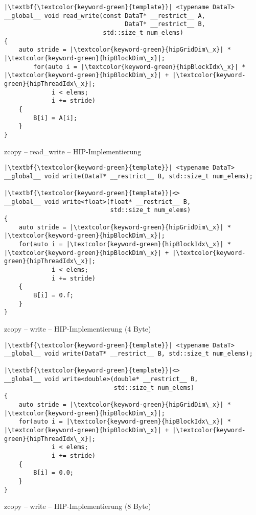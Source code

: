 \begin{code}
    \begin{verbatim}
|\textbf{\textcolor{keyword-green}{template}}| <typename DataT>
__global__ void read_write(const DataT* __restrict__ A,
                                 DataT* __restrict__ B,
                           std::size_t num_elems)
{
    auto stride = |\textcolor{keyword-green}{hipGridDim\_x}| * |\textcolor{keyword-green}{hipBlockDim\_x}|;
        for(auto i = |\textcolor{keyword-green}{hipBlockIdx\_x}| * |\textcolor{keyword-green}{hipBlockDim\_x}| + |\textcolor{keyword-green}{hipThreadIdx\_x}|;
             i < elems;
             i += stride)
    {
        B[i] = A[i];
    }
}
    \end{verbatim}
    \caption{zcopy -- read\_write -- HIP-Implementierung}
    \label{anhang:hip:zcopyrw}
\end{code}

\begin{code}
    \begin{verbatim}
|\textbf{\textcolor{keyword-green}{template}}| <typename DataT>
__global__ void write(DataT* __restrict__ B, std::size_t num_elems);

|\textbf{\textcolor{keyword-green}{template}}|<>
__global__ void write<float>(float* __restrict__ B,
                             std::size_t num_elems)
{
    auto stride = |\textcolor{keyword-green}{hipGridDim\_x}| * |\textcolor{keyword-green}{hipBlockDim\_x}|;
    for(auto i = |\textcolor{keyword-green}{hipBlockIdx\_x}| * |\textcolor{keyword-green}{hipBlockDim\_x}| + |\textcolor{keyword-green}{hipThreadIdx\_x}|;
             i < elems;
             i += stride)
    {
        B[i] = 0.f;
    }
}
    \end{verbatim}
    \caption{zcopy -- write -- HIP-Implementierung (4 Byte)}
    \label{anhang:hip:zcopyw4}
\end{code}

\begin{code}
    \begin{verbatim}
|\textbf{\textcolor{keyword-green}{template}}| <typename DataT>
__global__ void write(DataT* __restrict__ B, std::size_t num_elems);

|\textbf{\textcolor{keyword-green}{template}}|<>
__global__ void write<double>(double* __restrict__ B,
                              std::size_t num_elems)
{
    auto stride = |\textcolor{keyword-green}{hipGridDim\_x}| * |\textcolor{keyword-green}{hipBlockDim\_x}|;
    for(auto i = |\textcolor{keyword-green}{hipBlockIdx\_x}| * |\textcolor{keyword-green}{hipBlockDim\_x}| + |\textcolor{keyword-green}{hipThreadIdx\_x}|;
             i < elems;
             i += stride)
    {
        B[i] = 0.0;
    }
}
    \end{verbatim}
    \caption{zcopy -- write -- HIP-Implementierung (8 Byte)}
    \label{anhang:hip:zcopyw8}
\end{code}

